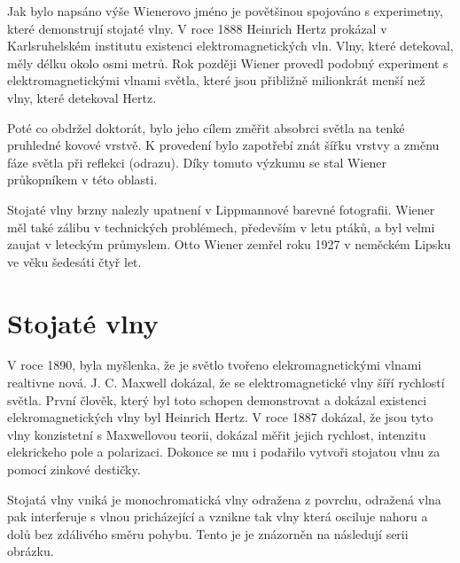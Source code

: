 \documentclass[12pt,a4paper,titlepage,final]{report}
\begin{document}
Jak bylo napsáno výše Wienerovo jméno je povětšinou spojováno s experimetny, které demonstrují stojaté vlny. V roce 1888 Heinrich Hertz
prokázal v Karlsruhelském institutu existenci elektromagnetických vln. Vlny, které detekoval, měly délku okolo osmi metrů. Rok později Wiener
provedl podobný experiment s elektromagnetickými vlnami světla, které jsou přibližně milionkrát menší než vlny, které detekoval Hertz. \cite{encyclopedia_otto}

Poté co obdržel doktorát, bylo jeho cílem změřit absobrci světla na tenké pruhledné kovové vrstvě. K provedení bylo zapotřebí znát šířku
vrstvy a změnu fáze světla při reflekci (odrazu). Díky tomuto výzkumu se stal Wiener průkopníkem v této oblasti. \cite{encyclopedia_otto}

Stojaté vlny brzny nalezly upatnení v Lippmannové barevné fotografii. Wiener měl také zálibu v technických problémech, především v letu ptáků, 
a byl velmi zaujat v leteckým průmyslem. Otto Wiener zemřel roku 1927 v neměckém Lipsku ve věku šedesáti čtyř let. \cite{wiki_otto}

\section{Stojaté vlny}
V roce 1890, byla myšlenka, že je světlo tvořeno elekromagnetickými
vlnami realtivne nová. J. C. Maxwell dokázal, že se elektromagnetické vlny šíří rychlostí světla. První člověk, který
byl toto schopen demonstrovat a dokázal existenci elekromagnetických vlny byl Heinrich Hertz. V roce 1887 dokázal, že jsou tyto vlny
konzistetní s Maxwellovou teorii, dokázal měřit jejich rychlost,
intenzitu elekrickeho pole a polarizaci. Dokonce se mu i 
podařilo vytvoři stojatou vlnu za pomocí zinkové destičky. \cite{skullsinthestars}

Stojatá vlny vniká je monochromatická vlny odražena z povrchu, odražená vlna pak interferuje s vlnou pricházející a vznikne tak 
vlny která osciluje nahoru a dolů bez zdálivého směru pohybu. 
Tento je je znázorněn na následují serii obrázku.
\end{document}
